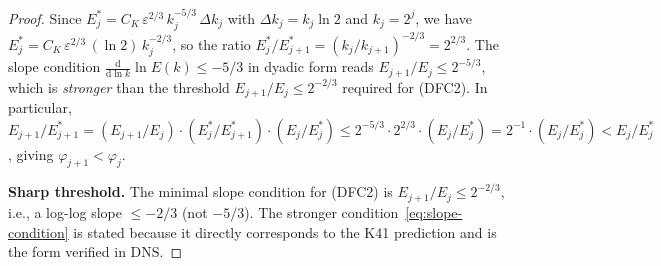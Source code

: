 \documentclass[12pt,a4paper]{article}
\theoremstyle{definition}
\theoremstyle{plain}
\theoremstyle{remark}
\begin{document}
\begin{proof}
Since $E_j^* = C_K\,\varepsilon^{2/3}\,k_j^{-5/3}\,\Delta k_j$ with
$\Delta k_j = k_j \ln 2$ and $k_j = 2^j$, we have
$E_j^* = C_K\,\varepsilon^{2/3}\,(\ln 2)\,k_j^{-2/3}$, so the ratio
$E_j^*/E_{j+1}^* = (k_j/k_{j+1})^{-2/3} = 2^{2/3}$. The slope
condition $\frac{\mathrm{d}}{\mathrm{d}\ln k}\ln E(k) \le -5/3$
in dyadic form reads $E_{j+1}/E_j \le 2^{-5/3}$, which is
\emph{stronger} than the threshold $E_{j+1}/E_j \le 2^{-2/3}$
required for (DFC2). In particular,
$E_{j+1}/E_{j+1}^* = (E_{j+1}/E_j)\cdot(E_j^*/E_{j+1}^*)\cdot(E_j/E_j^*)
\le 2^{-5/3}\cdot 2^{2/3}\cdot(E_j/E_j^*) = 2^{-1}\cdot(E_j/E_j^*)
< E_j/E_j^*$, giving $\varphi_{j+1} < \varphi_j$.

\smallskip\noindent
\textbf{Sharp threshold.}\;
The minimal slope condition for (DFC2) is $E_{j+1}/E_j \le 2^{-2/3}$,
i.e., a log-log slope $\le -2/3$ (not $-5/3$). The stronger
condition~\eqref{eq:slope-condition} is stated because it directly
corresponds to the K41 prediction and is the form verified in DNS.
\end{proof}
\end{document}
